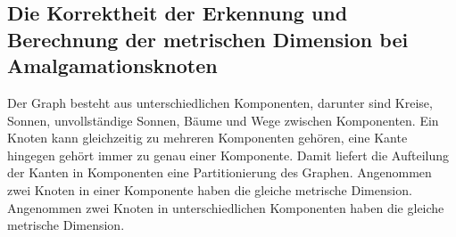 \subsection{Die Korrektheit der Erkennung und Berechnung der metrischen Dimension bei Amalgamationsknoten}
\label{korramal}
Der Graph besteht aus unterschiedlichen Komponenten, darunter sind Kreise, Sonnen, unvollständige Sonnen, Bäume und Wege zwischen Komponenten. Ein Knoten kann gleichzeitig zu mehreren Komponenten gehören, eine Kante hingegen gehört immer zu genau einer Komponente. Damit liefert die Aufteilung der Kanten in Komponenten eine Partitionierung des Graphen.\newline 
Angenommen zwei Knoten in einer Komponente haben die gleiche metrische Dimension. 
Angenommen zwei Knoten in unterschiedlichen Komponenten haben die gleiche metrische Dimension. 
